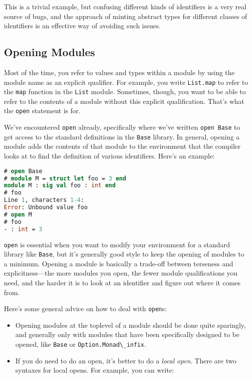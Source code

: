 This is a trivial example, but confusing different kinds of identifiers
is a very real source of bugs, and the approach of minting abstract
types for different classes of identifiers is an effective way of
avoiding such issues.

\hypertarget{opening-modules}{%
\subsection{Opening Modules}\label{opening-modules}}

Most of the time, you refer to values and types within a module by using
the module name as an explicit qualifier. For example, you write
\passthrough{\lstinline!List.map!} to refer to the
\passthrough{\lstinline!map!} function in the
\passthrough{\lstinline!List!} module. Sometimes, though, you want to be
able to refer to the contents of a module without this explicit
qualification. That's what the \passthrough{\lstinline!open!} statement
is for. 

We've encountered \passthrough{\lstinline!open!} already, specifically
where we've written \passthrough{\lstinline!open Base!} to get access to
the standard definitions in the \passthrough{\lstinline!Base!} library.
In general, opening a module adds the contents of that module to the
environment that the compiler looks at to find the definition of various
identifiers. Here's an example:

\begin{lstlisting}[language=Caml]
# open Base
# module M = struct let foo = 3 end
module M : sig val foo : int end
# foo
Line 1, characters 1-4:
Error: Unbound value foo
# open M
# foo
- : int = 3
\end{lstlisting}

\passthrough{\lstinline!open!} is essential when you want to modify your
environment for a standard library like \passthrough{\lstinline!Base!},
but it's generally good style to keep the opening of modules to a
minimum. Opening a module is basically a trade-off between terseness and
explicitness---the more modules you open, the fewer module
qualifications you need, and the harder it is to look at an identifier
and figure out where it comes from.

Here's some general advice on how to deal with
\passthrough{\lstinline!open!}s: 

\begin{itemize}
\item
  Opening modules at the toplevel of a module should be done quite
  sparingly, and generally only with modules that have been specifically
  designed to be opened, like \passthrough{\lstinline!Base!} or
  \passthrough{\lstinline!Option.Monad\_infix!}.
\item
  If you do need to do an open, it's better to do a \emph{local open}.
  There are two syntaxes for local opens. For example, you can write:
\end{itemize}


